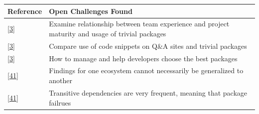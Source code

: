 \documentclass[]{book}
\begin{document}
\begin{longtable}[]{@{}ll@{}}
\toprule
\begin{minipage}[b]{0.13\columnwidth}\raggedright\strut
Reference\strut
\end{minipage} & \begin{minipage}[b]{0.29\columnwidth}\raggedright\strut
Open Challenges Found\strut
\end{minipage}\tabularnewline
\midrule
\endhead
\begin{minipage}[t]{0.13\columnwidth}\raggedright\strut
{[}\protect\hyperlink{ref-Abdalkareem2017}{3}{]}\strut
\end{minipage} & \begin{minipage}[t]{0.29\columnwidth}\raggedright\strut
Examine relationship between team experience and project maturity and
usage of trivial packages\strut
\end{minipage}\tabularnewline
\begin{minipage}[t]{0.13\columnwidth}\raggedright\strut
{[}\protect\hyperlink{ref-Abdalkareem2017}{3}{]}\strut
\end{minipage} & \begin{minipage}[t]{0.29\columnwidth}\raggedright\strut
Compare use of code snippets on Q\&A sites and trivial packages\strut
\end{minipage}\tabularnewline
\begin{minipage}[t]{0.13\columnwidth}\raggedright\strut
{[}\protect\hyperlink{ref-Abdalkareem2017}{3}{]}\strut
\end{minipage} & \begin{minipage}[t]{0.29\columnwidth}\raggedright\strut
How to manage and help developers choose the best packages\strut
\end{minipage}\tabularnewline
\begin{minipage}[t]{0.13\columnwidth}\raggedright\strut
{[}\protect\hyperlink{ref-Decan2018}{41}{]}\strut
\end{minipage} & \begin{minipage}[t]{0.29\columnwidth}\raggedright\strut
Findings for one ecosystem cannot necessarily be generalized to
another\strut
\end{minipage}\tabularnewline
\begin{minipage}[t]{0.13\columnwidth}\raggedright\strut
{[}\protect\hyperlink{ref-Decan2018}{41}{]}\strut
\end{minipage} & \begin{minipage}[t]{0.29\columnwidth}\raggedright\strut
Transitive dependencies are very frequent, meaning that package failrues

\end{minipage}
\end{longtable}
\end{document}
